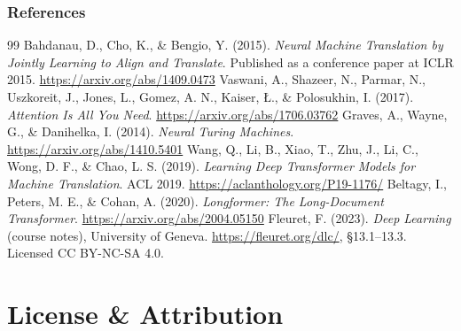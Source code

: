 \begin{vbframe}
\frametitle{References}
\footnotesize{
\begin{thebibliography}{99}
 Bahdanau, D., Cho, K., \& Bengio, Y. (2015). \textit{Neural Machine Translation by Jointly Learning to Align and Translate}. Published as a conference paper at ICLR 2015. \url{https://arxiv.org/abs/1409.0473}
 Vaswani, A., Shazeer, N., Parmar, N., Uszkoreit, J., Jones, L., Gomez, A. N., Kaiser, {\L}., \& Polosukhin, I. (2017). \textit{Attention Is All You Need}. \url{https://arxiv.org/abs/1706.03762}
 Graves, A., Wayne, G., \& Danihelka, I. (2014). \textit{Neural Turing Machines}. \url{https://arxiv.org/abs/1410.5401}
 Wang, Q., Li, B., Xiao, T., Zhu, J., Li, C., Wong, D. F., \& Chao, L. S. (2019). \textit{Learning Deep Transformer Models for Machine Translation}. ACL 2019. \url{https://aclanthology.org/P19-1176/}
 Beltagy, I., Peters, M. E., \& Cohan, A. (2020). \textit{Longformer: The Long-Document Transformer}. \url{https://arxiv.org/abs/2004.05150}
 Fleuret, F. (2023). \textit{Deep Learning} (course notes), University of Geneva. \url{https://fleuret.org/dlc/}, \S13.1--13.3. Licensed CC BY-NC-SA 4.0.
\end{thebibliography}
}
\end{vbframe}



\section{License \& Attribution}

